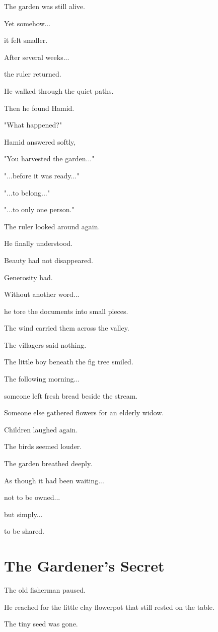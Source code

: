 \documentclass[12pt,openany]{book}
\begin{document}
The garden was still alive.

Yet somehow...

it felt smaller.

After several weeks...

the ruler returned.

He walked through the quiet paths.

Then he found Hamid.

"What happened?"

Hamid answered softly,

"You harvested the garden..."

"...before it was ready..."

"...to belong..."

"...to only one person."

The ruler looked around again.

He finally understood.

Beauty had not disappeared.

Generosity had.

Without another word...

he tore the documents into small pieces.

The wind carried them across the valley.

The villagers said nothing.

The little boy beneath the fig tree smiled.

The following morning...

someone left fresh bread beside the stream.

Someone else gathered flowers for an elderly widow.

Children laughed again.

The birds seemed louder.

The garden breathed deeply.

As though it had been waiting...

not to be owned...

but simply...

to be shared.
\section*{The Gardener's Secret}

The old fisherman paused.

He reached for the little clay flowerpot that still rested on the table.

The tiny seed was gone.
\end{document}
